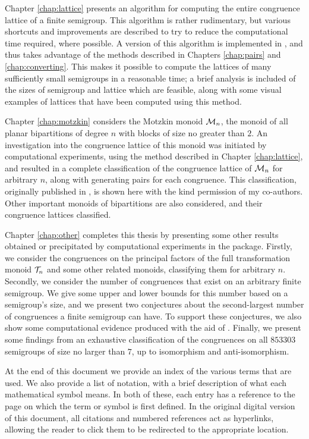 Chapter \ref{chap:lattice} presents an algorithm for computing the entire
congruence lattice of a finite semigroup.  This algorithm is rather rudimentary,
but various shortcuts and improvements are described to try to reduce the
computational time required, where possible.  A version of this algorithm is
implemented in \Semigroups{}, and thus takes advantage of the methods described
in Chapters \ref{chap:pairs} and \ref{chap:converting}.  This makes it possible
to compute the lattices of many sufficiently small semigroups in a reasonable
time; a brief analysis is included of the sizes of semigroup and lattice which
are feasible, along with some visual examples of lattices that have been
computed using this method.

Chapter \ref{chap:motzkin} considers the Motzkin monoid $\mathcal{M}_n$, the monoid of
all planar bipartitions of degree $n$ with blocks of size no greater than $2$.
An investigation into the congruence lattice of this monoid was initiated by
computational experiments, using the method described in Chapter
\ref{chap:lattice}, and resulted in a complete classification of the congruence
lattice of $\mathcal{M}_n$ for arbitrary $n$, along with generating pairs for each
congruence.  This classification, originally published in \cite{ourpaper}, is
shown here with the kind permission of my co-authors.  Other important monoids
of bipartitions are also considered, and their congruence lattices classified.

Chapter \ref{chap:other} completes this thesis by presenting some other results
obtained or precipitated by computational experiments in the \Semigroups{}
package.  Firstly, we consider the congruences on the principal factors of the
full transformation monoid $\mathcal{T}_n$ and some other related monoids, classifying
them for arbitrary $n$.  Secondly, we consider the number of congruences that
exist on an arbitrary finite semigroup.  We give some upper and lower bounds for
this number based on a semigroup's size, and we present two conjectures about
the second-largest number of congruences a finite semigroup can have.  To
support these conjectures, we also show some computational evidence produced
with the aid of \smallsemi{} \cite{smallsemi}.  Finally, we present some
findings from an exhaustive classification of the congruences on all $853303$
semigroups of size no larger than $7$, up to isomorphism and anti-isomorphism.

At the end of this document we provide an index of the various terms that are
used.  We also provide a list of notation, with a brief description of what each
mathematical symbol means.  In both of these, each entry has a reference to the
page on which the term or symbol is first defined.  In the original digital
version of this document, all citations and numbered references act as
hyperlinks, allowing the reader to click them to be redirected to the
appropriate location.
